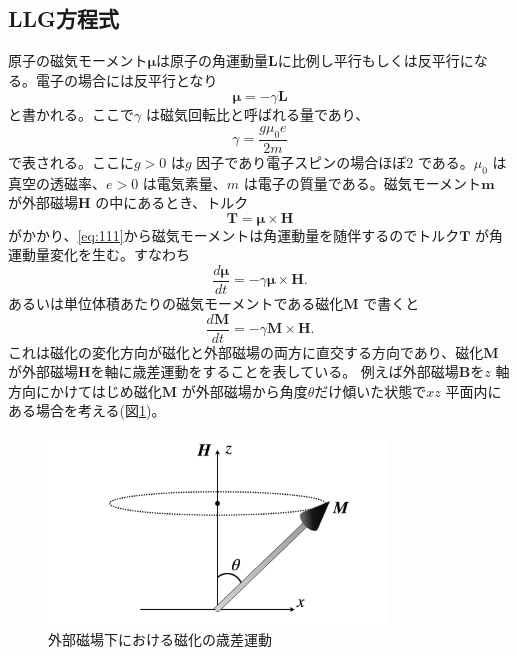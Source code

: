 \documentclass[dvipdfmx,11pt]{jsreport}
\numberwithin{equation}{chapter}
\numberwithin{table}{chapter}
\begin{document}
\subsection{LLG方程式}
原子の磁気モーメント$\bm{\mu}$は原子の角運動量$\bm{L}$に比例し平行もしくは反平行になる。電子の場合には反平行となり
\begin{equation}
\label{eq:111}
	\bm{\mu}=-\gamma \bm{L}
\end{equation}
と書かれる。ここで$\gamma$ は磁気回転比と呼ばれる量であり、
\begin{equation}
\label{eq:112}
	\gamma=\frac{g\mu_0e}{2m}
\end{equation}
で表される。ここに$g>0$ は$g$ 因子であり電子スピンの場合ほぼ$2$ である。$\mu_0$ は真空の透磁率、$e>0$ は電気素量、$m$ は電子の質量である。磁気モーメント$\bm{m}$ が外部磁場$\bm{H}$ の中にあるとき、トルク
\begin{equation}
\label{eq:113}
	\bm{T}=\bm{\mu}\times \bm{H}
\end{equation}
がかかり、\eqref{eq:111}から磁気モーメントは角運動量を随伴するのでトルク$\bm{T}$ が角運動量変化を生む。すなわち
\begin{equation}
\label{eq:114}
	\frac{d \bm{\mu}}{dt}=-\gamma \bm{\mu}\times \bm{H}
.\end{equation}
あるいは単位体積あたりの磁気モーメントである磁化$\bm{M}$ で書くと
\begin{equation}
\label{eq:115}
	\frac{d \bm{M}}{dt}=-\gamma \bm{M}\times \bm{H}
.\end{equation}
これは磁化の変化方向が磁化と外部磁場の両方に直交する方向であり、磁化$\bm{M}$が外部磁場$\bm{H}$を軸に歳差運動をすることを表している。
例えば外部磁場$\bm{B}$を$z$ 軸方向にかけてはじめ磁化$\bm{M}$ が外部磁場から角度$\theta$だけ傾いた状態で$xz$ 平面内にある場合を考える(図\ref{fig:fig-fig-007-jpeg})。
\begin{figure}[H]
	\centering
	\includegraphics[width=0.8\textwidth]{fig/fig.007.jpeg}
	\caption{外部磁場下における磁化の歳差運動}
	\label{fig:fig-fig-007-jpeg}
\end{figure}
\end{document}

